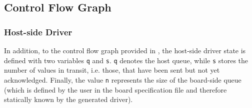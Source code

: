 \documentclass{report}
\begin{document}
%
%
%

\subsection{Control Flow Graph}

\subsubsection{Host-side Driver}
In addition, to the control flow graph provided in , the host-side driver state is defined with two variables \texttt{q} and \texttt{s}. \texttt{q} denotes the host queue, while \texttt{s} stores the number of values in transit, i.e. those, that have been sent but not yet acknowledged. Finally, the value \texttt{n} represents the size of the board-side queue (which is defined by the user in the board specification file and therefore statically known by the generated driver).
\end{document}
